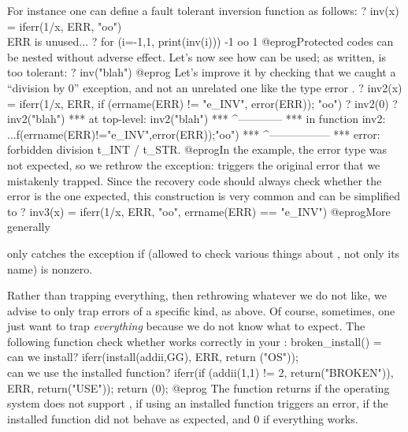 For instance one can define a fault tolerant inversion function as follows:
\bprog
? inv(x) = iferr(1/x, ERR, "oo")    \\ ERR is unused...
? for (i=-1,1, print(inv(i)))
-1
oo
1
@eprog\noindent Protected codes can be nested without adverse effect.
Let's now see how  can be used; as written,  is too
tolerant:
\bprog
? inv("blah")
@eprog Let's improve it by checking that we caught a ``division by 0''
exception, and not an unrelated one like the type error .
\bprog
? inv2(x) = {
  iferr(1/x,
        ERR, if (errname(ERR) != "e_INV", error(ERR)); "oo")
}
? inv2(0)
? inv2("blah")
  ***   at top-level: inv2("blah")
  ***                 ^------------
  ***   in function inv2: ...f(errname(ERR)!="e_INV",error(ERR));"oo")
  ***                                                 ^-----------------
  *** error: forbidden division t_INT / t_STR.
  @eprog\noindent In the  example, the error type was not
expected, so we rethrow the exception:  triggers the original
error that we mistakenly trapped. Since the recovery code should always check
whether the error is the one expected, this construction is very common and
can be simplified to
\bprog
? inv3(x) = iferr(1/x,
                  ERR, "oo",
                  errname(ERR) == "e_INV")
@eprog\noindent More generally


\noindent only catches the exception if  (allowed to check
various things about , not only its name) is nonzero.

Rather than trapping everything, then rethrowing whatever we do not like, we
advise to only trap errors of a specific kind, as above. Of course,
sometimes, one just want to trap \emph{everything} because we do not know
what to expect. The following function check whether  works
correctly in your :
\bprog
broken_install() =
{ \\ can we install?
  iferr(install(addii,GG),
        ERR, return ("OS"));
  \\ can we use the installed function?
  iferr(if (addii(1,1) != 2, return("BROKEN")),
        ERR, return("USE"));
  return (0);
}
@eprog
\noindent The function returns
 if the operating system does not support ,
 if using an installed function triggers an error,
 if the installed function did not behave as expected,
and 0 if everything works.


